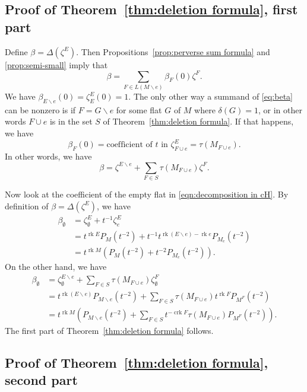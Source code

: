 \documentclass[12pt,reqno]{amsart}
\theoremstyle{definition}
\theoremstyle{remark}
\newcommand{\crk}{\operatorname{crk}}
\newcommand{\ssm}{\smallsetminus}
\newcommand{\rk}{\operatorname{rk}}
\renewcommand{\(}{\left(}
\renewcommand{\)}{\right)}
\newcommand{\<}{\left<}
\renewcommand{\>}{\right>}
\begin{document}
\subsection{Proof of Theorem~\ref{thm:deletion formula}, first part}


  Define $\beta = \Delta(\zeta^E)$.  Then Propositions~\ref{prop:perverse sum formula} and \ref{prop:semi-small} imply that
\begin{equation}\label{eq:beta}
\beta = \sum_{F\in L(M\ssm e)} \beta_F(0)\zeta^F.
\end{equation}
We have $\beta_{E\ssm e}(0) = \zeta^E_E(0)=1$.  The only other way a summand of \eqref{eq:beta} can be nonzero is if 
$F = G \ssm e$ for some flat $G$ of $M$ where $\delta(G) = 1$, or in other words $F \cup e$ is in the set $S$ of Theorem~\ref{thm:deletion formula}.  If that happens, we have 
\[\beta_{F}(0) = 
\mbox{coefficient of $t$ in } \zeta^E_{F\cup e} = \tau(M_{F\cup e}).\]
In other words, we have
\begin{equation}\label{eqn:decomposition in cH}
\beta = \zeta^{E \ssm e} + \sum_{F\in S} \tau(M_{F\cup e})\zeta^F.
\end{equation}

Now look at the coefficient of the empty flat in \eqref{eqn:decomposition in cH}.
By definition of $\beta = \Delta(\zeta^E)$, we have 
\begin{align*}
\beta_\emptyset  & = \zeta^E_\emptyset + t^{-1}\zeta^E_{e} \\
& = t^{\rk E}P_M(t^{-2}) + t^{-1}t^{\rk(E\ssm e) - \rk e}P_{M_{e}}(t^{-2})\\
& = t^{\rk M}(P_M(t^{-2}) + t^{-2}P_{M_e}(t^{-2})).
\end{align*}
On the other hand, we have
\begin{align*}
\beta_\emptyset & = \zeta^{E\ssm e}_\emptyset + \sum_{F\in S} \tau(M_{F\cup e}) \zeta^F_\emptyset\\
& = t^{\rk(E\ssm e)}P_{M\ssm e}(t^{-2}) + 
\sum_{F\in S} \tau(M_{F\cup e})t^{\rk F}P_{M^F}(t^{-2})\\
& = t^{\rk M}\left( P_{M\ssm e}(t^{-2}) + \sum_{F\in S} t^{-\crk F}\tau(M_{F\cup e})P_{M^F}(t^{-2})\right).
\end{align*}
The first part of Theorem~\ref{thm:deletion formula} follows.

\subsection{Proof of Theorem~\ref{thm:deletion formula}, second part}
\end{document}
